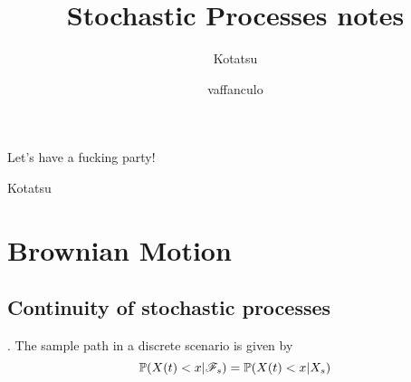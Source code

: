 \documentclass{report}
\begin{document}
	\title{Stochastic Processes notes}
	\author{Kotatsu}
	\date{\small vaffanculo}
	\maketitle
	\begin{preface}
Let's have a fucking party!
		
		\vskip1.2cm
		
		\hfill Kotatsu
	\end{preface}
	\clearpage
\chapter{Brownian Motion}	
	\section{Continuity of stochastic processes}.
	The sample path in a discrete scenario is given by
	\begin{equation*}
		\mathbb{P}(X(t)<x|\mathscr{F}_{s})=\mathbb{P}(X(t)<x|X_{s})
	\end{equation*}
	\tableofcontents
\clearpage
\listoffigures  
\end{document}
